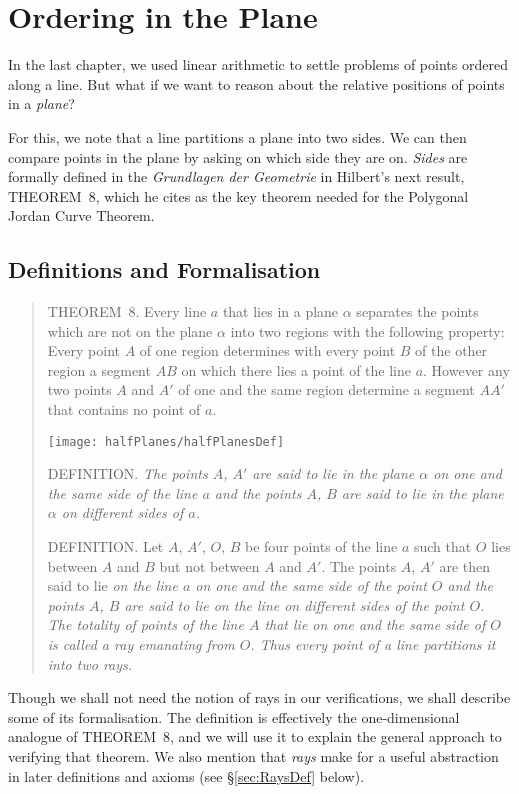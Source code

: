 \chapter{Ordering in the Plane}\label{chapter:HalfPlanes}
In the last chapter, we used linear arithmetic to settle problems of points ordered along a line. But what if we want to reason about the relative positions of points in a \emph{plane}? 

For this, we note that a line partitions a plane into two sides. We can then compare points in the plane by asking on which side they are on. \emph{Sides} are formally defined in the \emph{Grundlagen der Geometrie} in Hilbert's next result, THEOREM~8, which he cites as the key theorem needed for the Polygonal Jordan Curve Theorem.

\section{Definitions and Formalisation}
\begin{quotation}
THEOREM~8. Every line $a$ that lies in a plane $\alpha$ separates the points which are not on the plane $\alpha$ into two regions with the following property: Every point $A$ of one region determines with every point $B$ of the other region a segment $AB$ on which there lies a point of the line $a$. However any two points $A$ and $A'$ of one and the same region determine a segment $AA'$ that contains no point of $a$.

\begin{center}\texttt{[image: halfPlanes/halfPlanesDef]}\end{center}

DEFINITION. \emph{The points $A$, $A'$ are said to lie in the plane $\alpha$ on one and the same side of the line $a$ and the points $A$, $B$ are said to lie in the plane $\alpha$ on different sides of $a$.}

DEFINITION. Let $A$, $A'$, $O$, $B$ be four points of the line $a$ such that $O$ lies between $A$ and $B$ but not between $A$ and $A'$. The points $A$, $A'$ are then said to lie \emph{on the line $a$ on one and the same side of the point $O$ and the points $A$, $B$ are said to lie on the line on different sides of the point $O$. The totality of points of the line $A$ that lie on one and the same side of $O$ is called a \emph{ray} emanating from $O$. Thus every point of a line partitions it into two rays.}
\end{quotation}

Though we shall not need the notion of rays in our verifications, we shall describe some of its formalisation. The definition is effectively the one-dimensional analogue of THEOREM~8, and we will use it to explain the general approach to verifying that theorem. We also mention that \emph{rays} make for a useful abstraction in later definitions and axioms (see \S\ref{sec:RaysDef} below).

